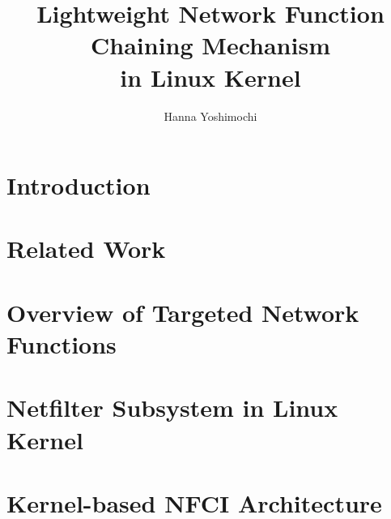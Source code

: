 \documentclass[12pt]{b-thesis}
\begin{document}
\title{Lightweight Network Function Chaining Mechanism \\ in Linux Kernel}
\subteacher{ }
\author{Hanna Yoshimochi}
\maketitle

 
\makejabstract 

\clearpage


\setcounter{page}{1}

\tableofcontents
\thispagestyle{plain}

\listoffigures   %
\listoftables    %

\clearpage

\pagestyle{headings}
\setcounter{page}{1}

\clearpage

\chapter{Introduction}
\label{chap:intro}


\chapter{Related Work}
\label{chap:related}


\chapter{Overview of Targeted Network Functions}
\label{chap:overview}


\chapter{Netfilter Subsystem in Linux Kernel}
\label{chap:linux}


\chapter{Kernel-based NFCI Architecture}
\label{chap:architecture}

\end{document}
